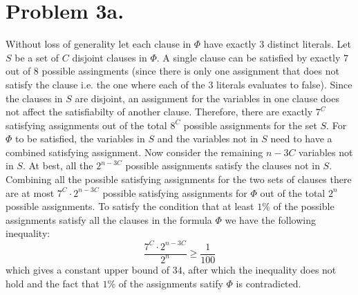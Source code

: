 \documentclass[12pt]{article}
\begin{document}
\pagestyle{plain}
\titleformat{\subsection}[runin]
  {\normalfont\large\bfseries}{\thesubsection}{1em}{}
\titleformat{\subsubsection}[runin]
  {\normalfont\large\bfseries}{\thesubsubsection}{1em}{}

\section*{Problem 3a.}
Without loss of generality let each clause in $\Phi$ have exactly $3$
distinct literals. Let $S$ be a set of $C$ disjoint clauses in $\Phi$.
A single clause can be satisfied by exactly $7$ out of $8$ possible assingments
(since there is only one assignment that does not satisfy the clause i.e. the
one where each of the $3$ literals evaluates to false). Since the clauses in $S$
are disjoint, an assignment for the variables in one clause does not affect the
satisfiabilty of another clause. Therefore, there are exactly $7^C$ satisfying
assignments out of the total $8^C$ possible assignments for the set $S$. For
$\Phi$ to be satisfied, the variables in $S$ and the variables not in $S$ need
to have a combined satisfying assignment. Now consider the remaining $n-3C$
variables not in $S$. At best, all the $2^{n-3C}$ possible assignments satisfy
the clauses not in $S$. Combining all the possible satisfying assignments for
the two sets of clauses there are at most $7^C \cdot 2^{n-3C}$ possible
satisfying assignments for $\Phi$ out of the total $2^n$ possible assignments.
To satisfy the condition that at least $1\%$ of the possible assignments satisfy
all the clauses in the formula $\Phi$ we have the following inequality:
$$\frac{7^C \cdot 2^{n-3C}}{2^n} \ge \frac{1}{100} $$
which gives a constant upper bound of $34$, after which the inequality does not
hold and the fact that $1\%$ of the assignments satify $\Phi$ is contradicted.
\end{document}
